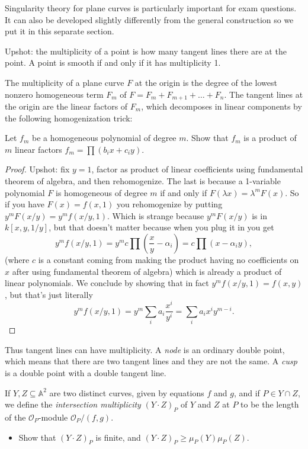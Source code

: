 \noindent
Singularity theory for plane curves
is particularly important for exam questions.
It can also be developed slightly differently
from the general construction so we put it
in this separate section.

\medskip\noindent
Upshot: the multiplicity of a point
is how many tangent lines there are at the
point. A point is smooth if and only if
it has multiplicity 1.

\medskip\noindent
The multiplicity of a plane curve $F$ at the
origin
is the degree of the lowest nonzero
homogeneous term $F_m$
of $F=F_m+F_{m+1}+…+F_n$.
The tangent lines at the origin are the
linear factors of $F_m$, which decomposes in
linear components
by the following homogenization trick:

\begin{exercise}
\label{exercise-factor-in-linear-terms}
Let $f_m$ be a homogeneous polynomial of
degree $m$.
Show that $f_m$ is a product of $m$ linear
factors
$f_m=\prod (b_ix+c_iy)$.
\end{exercise}

\begin{proof}
Upshot: fix $y=1$, factor as product of
linear coefficients
using fundamental theorem of algebra, and
then rehomogenize.
The last is because a 1-variable polynomial
$F$ is homogeneous of degree $m$ if and only
if
$F(\lambda x)=\lambda^mF(x)$. So if you have
$F(x)=f(x,1)$
you rehomogenize by putting
$y^mF(x/y)=y^mf(x/y,1)$.
Which is strange because $y^mF(x/y)$ is in
$k[x,y,1/y]$,
but that doesn't matter because when you plug
it in you get
 $$
y^mf(x/y,1)=y^mc\prod(\frac{x}{y}-\alpha_i)=
c\prod(x-\alpha_iy),
$$
(where $c$ is a constant coming from making
the product having no
coefficients on $x$ after using fundamental
theorem of algebra)
which is already a product of linear
polynomials.
We conclude by showing that in fact
$y^mf(x/y,1)=f(x,y)$,
but that's just literally
$$
y^mf(x/y,1)=y^m\sum_{i}a_i \frac{x^i}{y^i}
=\sum_ia_i x^iy^{m-i}.
$$
\end{proof}

\noindent
Thus tangent lines can have multiplicity.
A {\it node} is an ordinary double point,
which means that there are two tangent lines
and they are not the same.
A {\it cusp} is a double point with a double
tangent line.

\begin{exercise}
\label{exercise-intersection-multiplicity}
If $Y,Z \subseteq \mathbb{A}^2$ are two
distinct curves,
given by equations $f$ and $g$, and if $P \in
Y \cap Z$,
we define the {\it intersection multiplicity}
$(Y \cdot Z)_P$
of $Y$ and $Z$ at $P$ to be the length of the
$\mathcal{O}_P$-module $\mathcal{O}_P/(f,g)$.
\begin{itemize}
\item Show that $(Y\cdot Z)_P$ is finite,
and $(Y\cdot Z)_P \geq  \mu_P(Y) \mu_P(Z)$.
\end{itemize}
\end{exercise}


